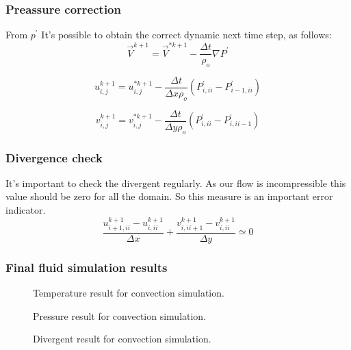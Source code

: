 \documentclass[xcolor=dvipsnames,10pt,aspectratio=169]{beamer}
\begin{document}
\begin{frame}
	\frametitle{Preassure correction}
	From $p^\prime$ It's possible to obtain the correct dynamic next time step, as follows:
	\begin{equation}
		\vec{V}^{k+1}  = \vec{V}^{\ast{k + 1}} - \frac{\Delta t}{\rho_o} \nabla P^\prime
	\end{equation}

	\begin{equation}
		u^{k+1}_{i, j}  = u^{\ast k+1}_{i, j} - \frac{\Delta t}{\Delta x \rho_o} \left(  P^{\prime}_{i , ii} -   P^{\prime}_{i - 1, ii}  \right)
	\end{equation}

	\begin{equation}
	v^{k+1}_{i, j}  = v^{\ast k+1}_{i, j} - \frac{\Delta t}{\Delta y \rho_o}  \left(  P^{\prime}_{i , ii} -   P^{\prime}_{i, ii-1}    \right)
	\end{equation}

\end{frame}

\begin{frame}
	\frametitle{Divergence check}
	It's important to check the divergent regularly. As our flow is incompressible this value should be zero for all the domain. So this measure is an important error indicator.
	\begin{equation}
	\frac{u_{i + 1 , ii}^{k + 1} - u_{i, ii}^{k + 1} }{\Delta x} + \frac{v_{i , ii + 1}^{k + 1} - v_{i, ii}^{k + 1} }{\Delta y} \simeq 0
	\end{equation}
\end{frame}

\begin{frame}
	\frametitle{Final fluid simulation results}
	\begin{minipage}[h!]{0.3\textwidth}
	\begin{figure}
	 	\caption{Temperature result for convection simulation.}
	\end{figure}
	\end{minipage}
	\begin{minipage}[h!]{0.3\textwidth}
	\begin{figure}
	 	\caption{Pressure result for convection simulation.}
	\end{figure}
	\end{minipage}
	\begin{minipage}[h!]{0.3\textwidth}
	\begin{figure}
	 	\caption{Divergent result for convection simulation.}
	\end{figure}
	\end{minipage}
\end{frame}
\end{document}
